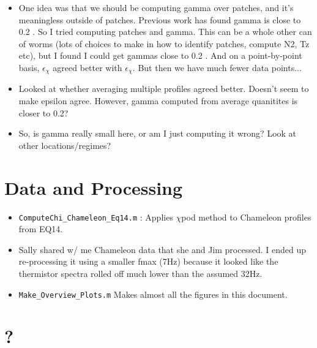\documentclass[11pt]{article}
\begin{document}
\begin{itemize}
\item One idea was that we should be computing gamma over patches, and it's meaningless outside of patches. Previous work has found gamma is close to 0.2 . So I tried computing patches and gamma. This can be a whole other can of worms (lots of choices to make in how to identify patches, compute N2, Tz etc), but I found I could get gammas close to 0.2 .  And on a point-by-point basis, $\epsilon_{\chi}$ agreed better with $\epsilon_{\chi}$. But then we have much fewer data points... 

\item Looked at whether averaging multiple profiles agreed better. Doesn't seem to make epsilon agree. However, gamma computed from average quanitites is closer to 0.2?

\item So, is gamma really small here, or am I just computing it wrong? Look at other locations/regimes?

\end{itemize}




\clearpage
\section{Data and Processing}

\begin{itemize}

\item \verb+ComputeChi_Chameleon_Eq14.m+ : Applies $\chi$pod method to Chameleon profiles from EQ14.

\item Sally shared w/ me Chameleon data that she and Jim processed. I ended up re-processing it using a smaller fmax (7Hz) because it looked like the thermistor spectra rolled off much lower than the assumed 32Hz.

\item \verb+Make_Overview_Plots.m+ Makes almost all the figures in this document.

\end{itemize}




\clearpage
\section{?}
\end{document}
